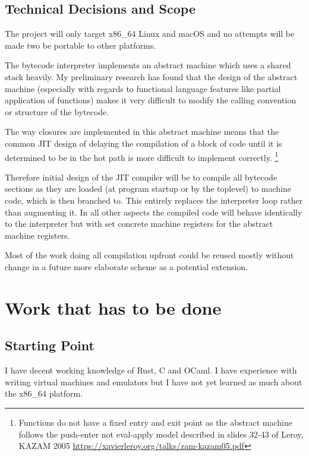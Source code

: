 \documentclass[12pt,a4paper, headings=standardclasses]{scrartcl}
\begin{document}
\subsection*{Technical Decisions and Scope}

The project will only target x86\_64 Linux and macOS and no attempts will be made
two be portable to other platforms.

The bytecode interpreter implements an abstract machine which uses a shared
stack heavily. My preliminary research has found that the design of the
abstract machine (especially with regards to functional language features
like partial application of functions) makes it very difficult to modify the
calling convention or structure of the bytecode.

The way closures are implemented in this abstract machine means that the common JIT
design of delaying the compilation of a block of code until it is determined
to be in the hot path is more difficult to implement correctly.
\footnote{Functions do not have a fixed entry and exit point as the abstract
    machine follows the push-enter not eval-apply model described in slides
    32-43 of Leroy, KAZAM 2005
    \href{https://xavierleroy.org/talks/zam-kazam05.pdf}{https://xavierleroy.org/talks/zam-kazam05.pdf}}

Therefore initial design of the JIT compiler will be to compile
all bytecode sections as they are loaded (at program startup or by the
toplevel) to machine code, which is then branched to. This entirely replaces the
interpreter loop rather than augmenting it. In all other aspects the compiled
code will behave identically to the interpreter but with set concrete machine
registers for the abstract machine registers.

Most of the work doing all compilation upfront could be reused mostly without change
in a future more elaborate scheme as a potential extension.

\section*{Work that has to be done}

\subsection*{Starting Point}

I have decent working knowledge of Rust, C and OCaml. I have experience with
writing virtual machines and emulators but I have not yet learned as much about
the x86\_64 platform.
\end{document}
